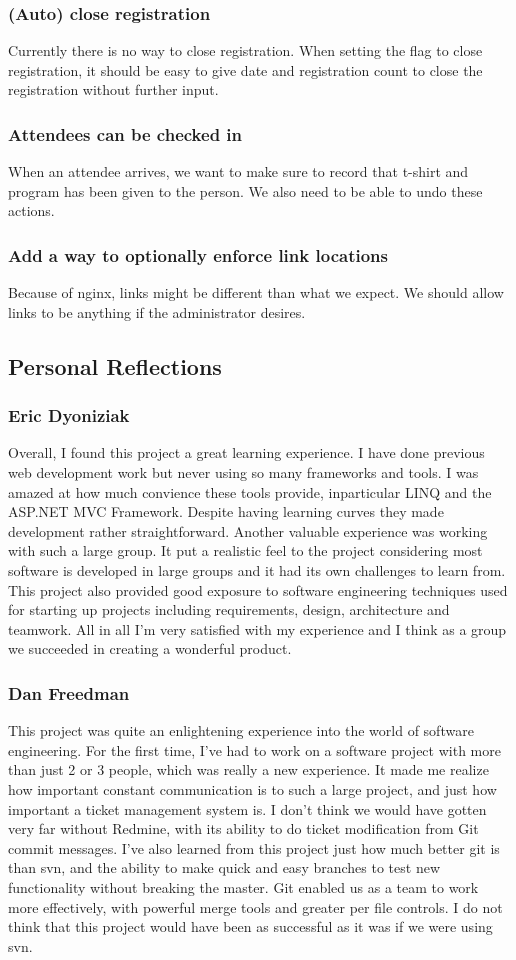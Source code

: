 \documentclass[12pt]{article}
\begin{document}
\subsubsection{(Auto) close registration}
Currently there is no way to close registration. When setting the flag to close
registration, it should be easy to give date and registration count to close
the registration without further input.
\subsubsection{Attendees can be checked in}
When an attendee arrives, we want to make sure to record that t-shirt and
program has been given to the person. We also need to be able to undo these
actions.
\subsubsection{Add a way to optionally enforce link locations}
Because of nginx, links might be different than what we expect. We should allow
links to be anything if the administrator desires.
\subsection{Personal Reflections}
\subsubsection{Eric Dyoniziak}
Overall, I found this project a great learning experience.  I have done previous web
development work but never using so many frameworks and tools.  I was amazed at how much
convience these tools provide, inparticular LINQ and the ASP.NET MVC Framework. Despite 
having learning curves they made development rather straightforward. Another valuable
experience was working with such a large group.  It put a realistic feel to the project
considering most software is developed in large groups and it had its own challenges to
learn from. This project also provided good exposure to software engineering techniques
used for starting up projects including requirements, design, architecture and teamwork.
All in all I'm very satisfied with my experience and I think as a group we succeeded in
creating a wonderful product. 
\subsubsection{Dan Freedman}
This project was quite an enlightening experience into the world of software engineering.
For the first time, I've had to work on a software project with more than just 2 or 3 people,
which was really a new experience. It made me realize how important constant communication
is to such a large project, and just how important a ticket management system is. I don't think
we would have gotten very far without Redmine, with its ability to do ticket modification from
Git commit messages. I've also learned from this project just how much better git is than svn,
and the ability to make quick and easy branches to test new functionality without breaking the master.
Git enabled us as a team to work more effectively, with powerful merge tools and greater per file controls.
I do not think that this project would have been as successful as it was if we were using svn.
\end{document}
